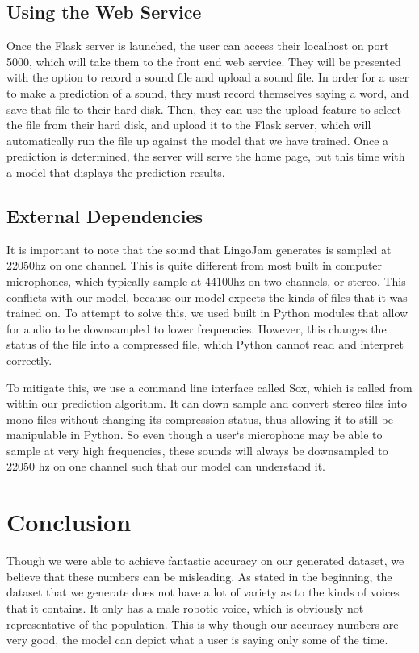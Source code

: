 \documentclass[12pt,journal,compsoc]{IEEEtran}
\begin{document}
\subsection{Using the Web Service}
Once the Flask server is launched, the user can access their localhost on port 5000, which will take them to the front end web service. They will be presented with the option to record a sound file and upload a sound file. In order for a user to make a prediction of a sound, they must record themselves saying a word, and save that file to their hard disk. Then, they can use the upload feature to select the file from their hard disk, and upload it to the Flask server, which will automatically run the file up against the model that we have trained. Once a prediction is determined, the server will serve the home page, but this time with a model that displays the prediction results. 

\subsection{External Dependencies}
It is important to note that the sound that LingoJam generates is sampled at 22050hz on one channel. This is quite different from most built in computer microphones, which typically sample at 44100hz on two channels, or stereo. This conflicts with our model, because our model expects the kinds of files that it was trained on. To attempt to solve this, we used built in Python modules that allow for audio to be downsampled to lower frequencies. However, this changes the status of the file into a compressed file, which Python cannot read and interpret correctly. 

To mitigate this, we use a command line interface called Sox, which is called from within our prediction algorithm. It can down sample and convert stereo files into mono files without changing its compression status, thus allowing it to still be manipulable in Python. So even though a user`s microphone may be able to sample at very high frequencies, these sounds will always be downsampled to 22050 hz on one channel such that our model can understand it. 

\section{Conclusion}

Though we were able to achieve fantastic accuracy on our generated dataset, we believe that these numbers can be misleading. As stated in the beginning, the dataset that we generate does not have a lot of variety as to the kinds of voices that it contains. It only has a male robotic voice, which is obviously not representative of the population. This is why though our accuracy numbers are very good, the model can depict what a user is saying only some of the time. 
\end{document}
